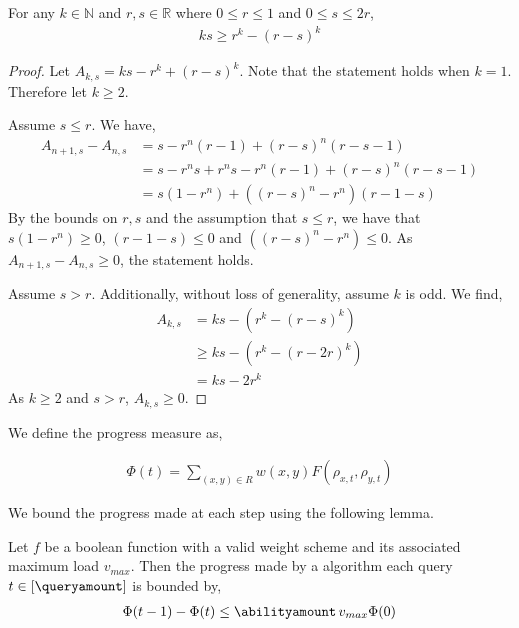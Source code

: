 \begin{proposition}\label{proposition_polynomial_bound}
        For any $k\in \mathbb{N}$ and $r,s\in \mathbb{R}$ where $ 0\leq r \leq 1 $ and $0\leq s \leq 2r$,
        \begin{align*}
            ks \geq r^k - (r-s)^k
        \end{align*}
\end{proposition}
\begin{proof}
    Let $A_{k,s} = ks - r^k + (r-s)^k$. Note that the statement holds when $k=1$. Therefore let $k\geq 2$.

    Assume $s\leq r$. We have,
    \begin{align*}
        A_{n+1,s} - A_{n,s} &= s - r^n(r-1) + (r-s)^n(r-s-1)\\
        &= s -r^ns +r^ns -r^n(r-1) + (r-s)^n(r-s-1)\\ 
        &= s(1-r^n)+((r-s)^n -r^n)(r-1-s)
    \end{align*}
    By the bounds on $r,s$ and the assumption that $s\leq r$, we have that $s(1-r^n)\geq 0$, $(r-1-s)\leq 0$ and $((r-s)^n -r^n)\leq 0$. As $A_{n+1,s} - A_{n,s} \geq 0$, the statement holds. 

    Assume $s>r$. Additionally, without loss of generality, assume $k$ is odd. We find,
    \begin{align*}
        A_{k,s} &= ks-(r^k-(r-s)^k)\\
            &\geq ks - (r^k-(r-2r)^k)\\
            &= ks - 2r^k
    \end{align*}
    As $k\geq 2$ and $s>r$, $A_{k,s}\geq 0$.
\end{proof}

We define the progress measure as,

\begin{align*}
    \Phi(t) = \sum_{(x,y)\in R} w(x,y) F(\rho_{x,t}, \rho_{y,t})
\end{align*}

We bound the progress made at each step using the following lemma.

\begin{lemma}\label{lemma_progress_measure_partial_measurement}
    Let $f$ be a boolean function with a valid weight scheme and its associated maximum load $v_{max}$. Then the progress made by a \pdqpname algorithm each query $t\in [\queryamount]$ is bounded by,
    \begin{align*}
        \Phi(t-1)-\Phi(t)\leq \abilityamount\, v_{max} \Phi (0)
    \end{align*}
\end{lemma}

